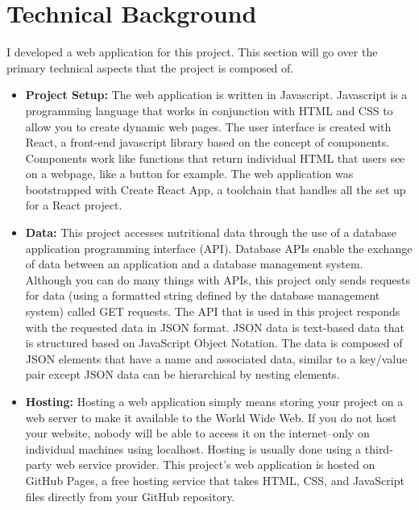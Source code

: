 \documentclass[10pt,twocolumn]{article}
\begin{document}
\section{Technical Background}

I developed a web application for this project. This section will go over the primary technical aspects that the project is composed of. 

\begin{itemize}
\item \textbf{Project Setup:} The web application is written in Javascript. Javascript is a programming language that works in conjunction with HTML and CSS to allow you to create dynamic web pages.\cite{mozilla} The user interface is created with React, a front-end javascript library based on the concept of components.\cite{REACT} Components work like functions that return individual HTML that users see on a webpage, like a button for example. The web application was bootstrapped with Create React App, a toolchain that handles all the set up for a React project.\cite{react_app}

\item \textbf{Data:} This project accesses nutritional data through the use of a database application programming interface (API). Database APIs enable the exchange of data between an application and a database management system.\cite{winsberg_2022} Although you can do many things with APIs, this project only sends requests for data (using a formatted string defined by the database management system) called GET requests. The API that is used in this project responds with the requested data in JSON format. JSON data is text-based data that is structured based on JavaScript Object Notation.\cite{winsberg_2022}  The data is composed of JSON elements that have a name and associated data, similar to a key/value pair except JSON data can be hierarchical by nesting elements.

\item \textbf{Hosting:} Hosting a web application simply means storing your project on a web server to make it available to the World Wide Web. If you do not host your website, nobody will be able to access it on the internet–only on individual machines using localhost. Hosting is usually done using a third-party web service provider. This project’s web application is hosted on GitHub Pages, a free hosting service that takes HTML, CSS, and JavaScript files directly from your GitHub repository.\cite{github}
\end{itemize}
\end{document}
